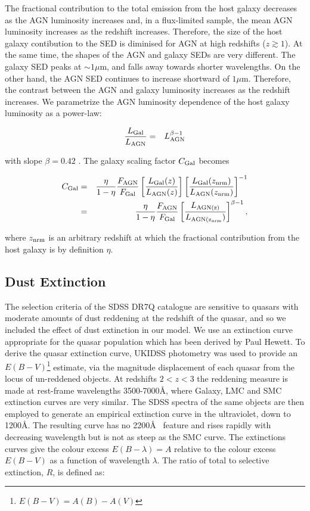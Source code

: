 The fractional contribution to the total emission from the host galaxy decreases as the AGN luminosity increases and, in a flux-limited sample, the mean AGN luminosity increases as the redshift increases.
Therefore, the size of the host galaxy contibution to the SED is diminised for AGN at high redshifts ($z\gtrsim1$). 
At the same time, the shapes of the AGN and galaxy SEDs are very different. 
The galaxy SED peaks at $\sim1\mu$m, and falls away towards shorter wavelengths. 
On the other hand, the AGN SED continues to increase shortward of $1\mu$m. 
Therefore, the contrast between the AGN and galaxy luminosity increases as the redshift increases. 
We parametrize the AGN luminosity dependence of the host galaxy luminosity as a power-law:

\begin{eqnarray}
  \label{eq:lgal}
  \frac{L_{\rm Gal}}{L_{\rm AGN}} &=& L_{\rm AGN}^{\beta - 1} 
\end{eqnarray}

with slope $\beta=0.42$ \citep{croom04}. 
The galaxy scaling factor $C_{\rm Gal}$ becomes 

\begin{eqnarray}
  C_{\rm Gal} &=& \frac{\eta}{1 - \eta} \frac{F_{\rm AGN}}{F_{\rm Gal}} \left[ \frac{ L_{\rm Gal}(z)} {L_{\rm AGN}(z)} \right] \left[ \frac{ L_{\rm Gal}(z_{\rm nrm})} {L_{\rm AGN}(z_{\rm nrm})} \right]^{-1} \\
  &=& \frac{\eta}{1 - \eta} \frac{F_{\rm AGN}}{F_{\rm Gal}} \left[ \frac{L_{\rm AGN(z)}} {L_{\rm AGN(z_{\rm nrm}})} \right]^{\beta -1}, 
\end{eqnarray}

where $z_{\rm nrm}$ is an arbitrary redshift at which the fractional contribution from the host galaxy is by definition $\eta$. 

\subsection{Dust Extinction}
\label{sec:sed-extinction} 

The selection criteria of the SDSS DR7Q catalogue are sensitive to quasars with moderate amounts of dust reddening at the redshift of the quasar, and so we included the effect of dust extinction in our model. 
We use an extinction curve appropriate for the quasar population which has been derived by Paul Hewett. 
To derive the quasar extinction curve, UKIDSS photometry was used to provide an $E(B-V)$\footnote{$E(B-V)=A(B)-A(V)$} estimate, via the magnitude displacement of each quasar from the locus of un-reddened objects. 
At redshifts $2 < z < 3$ the reddening measure is made at rest-frame wavelengths 3500-7000\AA, where Galaxy, LMC and SMC extinction curves are very similar. 
The SDSS spectra of the same objects are then employed to generate an empirical extinction curve in the ultraviolet, down to 1200\AA. 
The resulting curve has no 2200\AA~ feature and rises rapidly with decreasing wavelength but is not as steep as the SMC curve. 
The extinctions curves give the colour excess $E(B-\lambda) = A$ relative to the colour excess $E(B-V)$ as a function of wavelength $\lambda$. 
The ratio of total to selective extinction, $R$, is defined as: 

